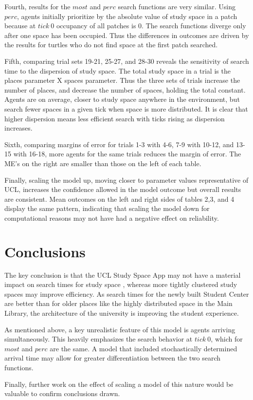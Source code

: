\documentclass[11pt]{article} %
\begin{document}
Fourth, results for the $most$ and $perc$ search functions are very similar. Using $perc$, agents initially prioritize by the absolute value of study space in a patch because at $tick \: 0$ occupancy of all patches is 0.  The search functions diverge only after one space has been occupied. Thus the differences in outcomes are driven by the results for turtles who do not find space at the first patch searched. 

Fifth, comparing trial sets 19-21, 25-27, and 28-30 reveals the sensitivity of search time to the dispersion of study space. The total study space in a trial is the places parameter X spaces parameter. Thus the three sets of trials increase the number of places, and decrease the number of spaces, holding the total constant. Agents are on average, closer to study space anywhere in the environment, but search fewer spaces in a given tick when space is more distributed. It is clear that higher dispersion means less efficient search with ticks rising as dispersion increases. 

Sixth, comparing margins of error for trials 1-3 with 4-6, 7-9 with 10-12, and 13-15 with 16-18, more agents for the same trials reduces the margin of error. The ME's on the right are smaller than those on the left of each table. 

Finally, scaling the model up, moving closer to parameter values representative of UCL, increases the confidence allowed in the model outcome but overall results are consistent. Mean outcomes on the left and right sides of tables 2,3, and 4 display the same pattern, indicating that scaling the model down for computational reasons may not have had a negative effect on reliability. 

\section{Conclusions}

The key conclusion is that the UCL Study Space App may not have a material impact on search times for study space , whereas more tightly clustered study spaces may improve efficiency. As search times for the newly built Student Center are better than for older places like the highly distributed space in the Main Library, the architecture of the university is improving the student experience. 

As mentioned above, a key unrealistic feature of this model is agents arriving simultaneously. This heavily emphasizes the search behavior at $tick \: 0$, which for $most$ and $perc$ are the same. A model that included stochastically determined arrival time may allow for greater differentiation between the two search functions. 

Finally, further work on the effect of scaling a model of this nature would be valuable to confirm conclusions drawn.  

\pagebreak

\printbibliography
\end{document}
